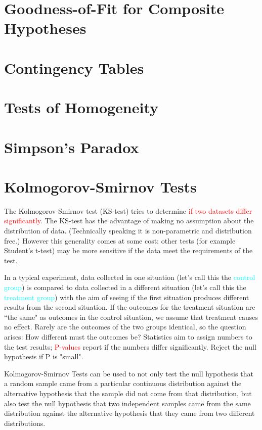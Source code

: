 \documentclass[12pt,a4paper]{article}
\begin{document}
\section{Goodness-of-Fit for Composite Hypotheses}


\section{Contingency Tables}


\section{Tests of Homogeneity}


\section{Simpson’s Paradox}



\section{Kolmogorov-Smirnov Tests}

The Kolmogorov-Smirnov test (KS-test) tries to determine \textcolor{red}{if two datasets differ significantly}. The KS-test has the advantage of making no assumption about the distribution of data. (Technically speaking it is non-parametric and distribution free.) However this generality comes at some cost: other tests (for example Student's t-test) may be more sensitive if the data meet the requirements of the test. 

In a typical experiment, data collected in one situation (let's call this the \textcolor{cyan}{control group}) is compared to data collected in a different situation (let's call this the \textcolor{cyan}{treatment group}) with the aim of seeing if the first situation produces different results from the second situation. If the outcomes for the treatment situation are ``the same" as outcomes in the control situation, we assume that treatment causes no effect. Rarely are the outcomes of the two groups identical, so the question arises: How different must the outcomes be? Statistics aim to assign numbers to the test results; \textcolor{red}{P-values} report if the numbers differ significantly. Reject the null hypothesis if P is "small".

Kolmogorov-Smirnov Tests can be used to not only test the null hypothesis that a random sample came from a particular continuous distribution against the alternative hypothesis that the sample did not come from that distribution, but also test the null hypothesis that two independent samples came from the same distribution against the alternative hypothesis that they came from two different distributions.
\end{document}
